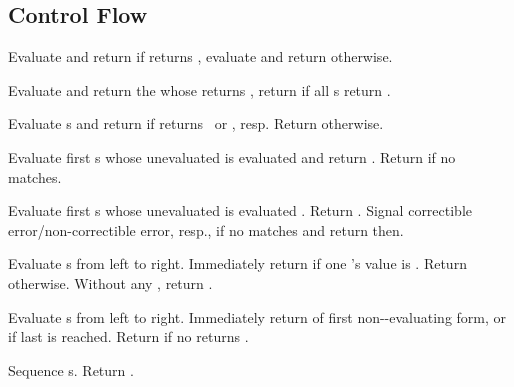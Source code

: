 \subsection{Control Flow}
\begin{LIST}{1cm}

  {Evaluate and return
   if  returns \T, evaluate and return
   otherwise.
  }

  {
  Evaluate and return the
   whose  returns \T, return
  \retval{\NIL} if all s return \NIL.
  }

  {
  Evaluate s and return  if
   returns \T\ or \NIL, resp. Return \retval{\NIL} otherwise.
  }

  {
  Evaluate first s whose unevaluated  is
   evaluated  and return .
  Return  if no  matches. 
  }

  {
  Evaluate first s whose unevaluated  is  evaluated
  . Return . Signal correctible error/non-correctible error,
  resp., if no  matches and return \retval{\NIL} then.
  }

  {
  Evaluate s from left to
  right. Immediately return \retval{\NIL} if one 's value is \NIL. Return
   otherwise. Without any ,
  return \retval{\NIL}.
  }

  {
  Evaluate s from left to
  right. Immediately return  of first
  non-\NIL-evaluating form, or  if last 
  is reached. Return \retval{\NIL} if no  returns \T.
  }

  {Sequence s. Return
  .
  }


\end{LIST}
